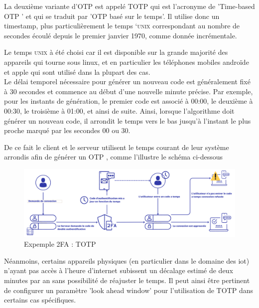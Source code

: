 \documentclass[a4paper, 10pt]{article}
\newcommand{\otp}{\textsc{OTP} }
\newcommand{\totp}{\textsc{TOTP} }
\begin{document}
    La deuxième variante d'\otp est appelé \totp 
qui est l'acronyme de \textcolor{myblue}{'Time-based \otp'} et qui se traduit par '\otp basé sur le temps'. Il utilise donc un timestamp, plus particulièrement \textcolor{mygreen}{le temps `\textsc{unix}} correspondant au nombre de secondes écoulé depuis le premier janvier 1970, comme donnée incrémentale. 

Le temps \textsc{unix} à été choisi car il est disponible sur la grande majorité des appareils qui tourne sous linux, et en particulier les téléphones mobiles androïde et apple qui sont utilisé dans la plupart des cas.\\

Le \textcolor{myblue}{délai temporel} nécessaire pour générer un nouveau code est généralement fixé à \textcolor{mygreen}{30 secondes} et commence au début d'une nouvelle minute précise. Par exemple, pour les instants de génération, le premier code est associé à 00:00, le deuxième à 00:30, le troisième à 01:00, et ainsi de suite. Ainsi, lorsque l'algorithme doit générer un nouveau code, il \textcolor{myblue}{arrondit le temps vers le bas} jusqu'à l'instant le plus proche marqué par les secondes \textcolor{myblue}{00 ou 30}.


    De ce fait le client et le serveur utilisent le temps courant de leur système arrondis afin de générer un \otp, comme l'illustre le schéma ci-dessous

\begin{figure}[H]
        \centering
        \includegraphics[scale=0.30]{img/1/3/2FA-totp.png}
        \caption{Expemple 2FA : \totp\\}
        \label{fig:2fa-totp}
\end{figure}


    Néanmoins, certains appareils physiques (en particulier dans le domaine des iot) n'ayant pas accès à l'heure d'internet
subissent un \textcolor{myblue}{décalage estimé de deux minutes par an} sans possibilité de réajuster le temps. 
Il peut ainsi être pertinent de configurer un \textcolor{mygreen}{paramètre 'look ahead window'} pour l'utilisation de \totp dans certains \textcolor{myblue}{cas spécifiques.}\\
\end{document}
